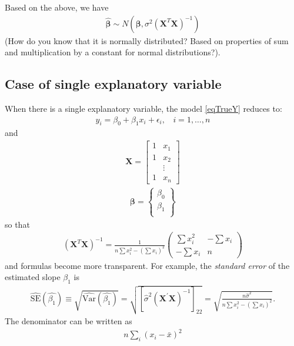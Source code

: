 \documentclass[11pt]{article}
\theoremstyle{remark}
\begin{document}
Based on the above, we have
\begin{eqnarray}
\boldsymbol{\hat{\beta}}\sim N(\boldsymbol{\beta},\sigma^2 \left(\mathbf{X}^T\mathbf{X}\right)^{-1})
\label{NormallyDistributedBetaHat}
\end{eqnarray}
(How do you know that it is normally distributed? Based on properties of sum and multiplication by a constant for normal distributions?).

\subsection{Case of single explanatory variable}
When there is a single explanatory variable, the model \eqref{eqTrueY} reduces to:
\begin{eqnarray}
y_i = \beta_0 + \beta_1 x_i + \epsilon_i,\:\:\:\:i = 1,\hdots,n
\end{eqnarray}
and
\begin{eqnarray}
\mathbf{X} =
\left[
\begin{array}{cc}
1 & x_1\\
1 & x_2\\
  & \vdots\\
1 & x_n
\end{array}
\right]
\end{eqnarray}
\begin{eqnarray}
\boldsymbol{\beta} =
\left\{
\begin{array}{c}
\beta_0\\
\beta_1\\
\end{array}
\right\}
\end{eqnarray}
so that
\begin{eqnarray}
(\mathbf{X}^T \mathbf{X})^{-1} = \frac{1}{n\sum x_i^2 - (\sum x_i)^2}
\left(
\begin{array}{cc}
\sum x_i^2 & -\sum x_i \\
-\sum x_i  & n
\end{array}
\right)
\end{eqnarray}
and formulas become more transparent. For example, the \emph{standard error} of the estimated slope $\beta_1$ is
\begin{eqnarray}
\widehat{\text{SE}}(\hat{\beta_1}) \equiv \sqrt{\widehat{\text{Var}}(\hat{\beta_1})} = \sqrt{[\hat{\sigma}^2  (\mathbf{X}^{\prime} \mathbf{X})^{-1}]_{22}} = \sqrt{\frac{n \hat{\sigma}^2}{n\sum x_i^2 - (\sum x_i)^2}}.
\end{eqnarray}
The denominator can be written as
\begin{eqnarray}
n \sum_i (x_i - \bar{x})^2
\end{eqnarray}
\end{document}
